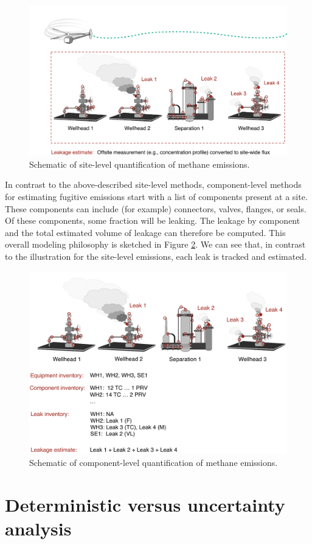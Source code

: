 \documentclass[11pt]{report}
\begin{document}
 \begin{figure}[t]
\includegraphics[width=0.8\columnwidth]{images/Site_VF.pdf}
\caption{Schematic of site-level quantification of methane emissions.}
\label{fig:site_vf}
\end{figure}

In contrast to the above-described site-level methods, component-level methods for estimating fugitive emissions start with a list of components present at a site. These components can include (for example) connectors, valves, flanges, or seals. Of these components, some fraction will be leaking. The leakage by component and the total estimated volume of leakage can therefore be computed. This overall modeling philosophy is sketched in Figure \ref{fig:component_vf}. We can see that, in contrast to the illustration for the site-level emissions, each leak is tracked and estimated. 

 \begin{figure}[t]
\includegraphics[width=0.8\columnwidth]{images/Component_VF.pdf}
\caption{Schematic of component-level quantification of methane emissions.}
\label{fig:component_vf}
\end{figure}
 
\section{Deterministic versus uncertainty analysis}
\end{document}
